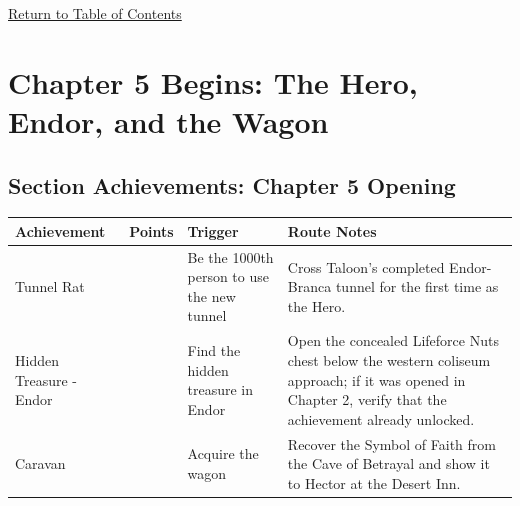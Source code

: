 \documentclass[
  american,
  10pt,
  letterpaper,
  oneside,
  open=any]{scrreprt}
\newcounter{none} %
\newenvironment{guidetable}{%
  \small\setstretch{1.0}%
  \setlength{\tabcolsep}{4pt}%
  \setlength{\LTpre}{8pt}\setlength{\LTpost}{10pt}%
  \renewcommand{\arraystretch}{1.16}%
}{ }
\begin{document}
\hyperref[table-of-contents]{Return to Table of Contents}

\chapter{Chapter 5 Begins: The Hero, Endor, and the
Wagon}\label{chapter-5-begins-the-hero-endor-and-the-wagon}

\section{Section Achievements: Chapter 5
Opening}\label{section-achievements-chapter-5-opening}

\begin{guidetable}

{\def\LTcaptype{none} %
\begin{longtable}[]{@{}
  >{\raggedright\arraybackslash}p{}
  >{\raggedleft\arraybackslash}p{}
  >{\raggedright\arraybackslash}p{}
  >{\raggedright\arraybackslash}p{}@{}}
\toprule\noalign{}
\begin{minipage}[b]{\linewidth}\raggedright
\color{GuideGreen}\bfseries Achievement
\end{minipage} & \begin{minipage}[b]{\linewidth}\raggedleft
\color{GuideGreen}\bfseries Points
\end{minipage} & \begin{minipage}[b]{\linewidth}\raggedright
\color{GuideGreen}\bfseries Trigger
\end{minipage} & \begin{minipage}[b]{\linewidth}\raggedright
\color{GuideGreen}\bfseries Route Notes
\end{minipage} \\
\midrule\noalign{}
\endhead
\bottomrule\noalign{}
\endlastfoot
Tunnel Rat & 5 & Be the 1000th person to use the new tunnel & Cross
Taloon's completed Endor-Branca tunnel for the first time as the
Hero. \\
Hidden Treasure - Endor & 5 & Find the hidden treasure in Endor & Open
the concealed Lifeforce Nuts chest below the western coliseum approach;
if it was opened in Chapter 2, verify that the achievement already
unlocked. \\
Caravan & 10 & Acquire the wagon & Recover the Symbol of Faith from the
Cave of Betrayal and show it to Hector at the Desert Inn. \\
\end{longtable}
}

\end{guidetable}
\end{document}
